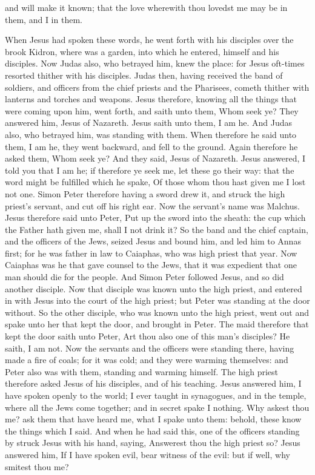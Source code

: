 and will make it known; that the love wherewith thou lovedst me may be in them, and I in them. 

When Jesus had spoken these words, he went forth with his disciples over the brook Kidron, where was a garden, into which he entered, himself and his disciples. Now Judas also, who betrayed him, knew the place: for Jesus oft-times resorted thither with his disciples. Judas then, having received the band of soldiers, and officers from the chief priests and the Pharisees, cometh thither with lanterns and torches and weapons. Jesus therefore, knowing all the things that were coming upon him, went forth, and saith unto them, Whom seek ye? They answered him, Jesus of Nazareth. Jesus saith unto them, I am he. And Judas also, who betrayed him, was standing with them. When therefore he said unto them, I am he, they went backward, and fell to the ground. Again therefore he asked them, Whom seek ye? And they said, Jesus of Nazareth. Jesus answered, I told you that I am he; if therefore ye seek me, let these go their way: that the word might be fulfilled which he spake, Of those whom thou hast given me I lost not one. Simon Peter therefore having a sword drew it, and struck the high priest’s servant, and cut off his right ear. Now the servant’s name was Malchus. Jesus therefore said unto Peter, Put up the sword into the sheath: the cup which the Father hath given me, shall I not drink it?  So the band and the chief captain, and the officers of the Jews, seized Jesus and bound him, and led him to Annas first; for he was father in law to Caiaphas, who was high priest that year. Now Caiaphas was he that gave counsel to the Jews, that it was expedient that one man should die for the people.  And Simon Peter followed Jesus, and so did another disciple. Now that disciple was known unto the high priest, and entered in with Jesus into the court of the high priest; but Peter was standing at the door without. So the other disciple, who was known unto the high priest, went out and spake unto her that kept the door, and brought in Peter. The maid therefore that kept the door saith unto Peter, Art thou also one of this man’s disciples? He saith, I am not. Now the servants and the officers were standing there, having made a fire of coals; for it was cold; and they were warming themselves: and Peter also was with them, standing and warming himself.  The high priest therefore asked Jesus of his disciples, and of his teaching. Jesus answered him, I have spoken openly to the world; I ever taught in synagogues, and in the temple, where all the Jews come together; and in secret spake I nothing. Why askest thou me? ask them that have heard me, what I spake unto them: behold, these know the things which I said. And when he had said this, one of the officers standing by struck Jesus with his hand, saying, Answerest thou the high priest so? Jesus answered him, If I have spoken evil, bear witness of the evil: but if well, why smitest thou me? 